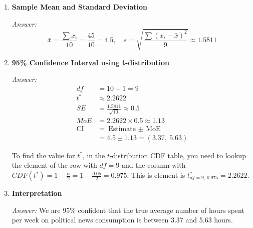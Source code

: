 \documentclass[12pt]{article}
\begin{document}
\begin{enumerate}[label=6.\arabic*]
    \item \textbf{Sample Mean and Standard Deviation}

    \textit{Answer:}  
\[
    \bar{x} = \frac{\sum x_i}{10} = \frac{45}{10} = \boxed{4.5}, \quad s = \sqrt{\frac{\sum (x_i-\bar x)^2}{9}} \approx \boxed{1.5811}
\]

    \item \textbf{95\% Confidence Interval using t-distribution}

    \textit{Answer:}  
    \begin{align*}
    df &= 10 - 1 = 9 \\
    t^* &\approx 2.2622 \\
    SE &= \frac{1.5811}{\sqrt{10}} \approx 0.5 \\
    MoE &= 2.2622 \times 0.5 \approx 1.13 \\
    \text{CI} &= \text{Estimate $\pm$ MoE} \\
    &=  4.5 \pm 1.13 = \boxed{(3.37,\ 5.63)}
    \end{align*}

    To find the value for $t^*$, in the $t$-distribution CDF table, you need to lookup the element of the row with $df=9$ and the column with $CDF(t^*)=1-\frac{\alpha}{2}=1-\frac{0.05}{2}=0.975$. This is element is  $t_{df=9,\,0.975}^* = 2.2622$. 

    \item \textbf{Interpretation}

    \textit{Answer:} We are 95\% confident that the true average number of hours spent per week on political news consumption is between 3.37 and 5.63 hours.
\end{enumerate}
\end{document}
